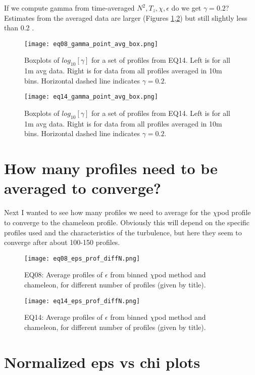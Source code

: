 \documentclass[11pt]{article}
\begin{document}
If we compute gamma from time-averaged $N^2,T_z,\chi,\epsilon$ do we get $\gamma=0.2$? Estimates from the averaged data are larger (Figures \ref{gambox_eq08},\ref{gambox_eq14}) but still slightly less than 0.2 .

\begin{figure}[htbp]
\texttt{[image: eq08\_gamma\_point\_avg\_box.png]}
\caption{Boxplots of $log_{10}[\gamma]$ for a set of profiles from EQ14. Left is for all 1m avg data. Right is for data from all profiles averaged in 10m bins. Horizontal dashed line indicates $\gamma=0.2$.}
\label{gambox_eq08}
\end{figure}

\begin{figure}[htbp]
\texttt{[image: eq14\_gamma\_point\_avg\_box.png]}
\caption{Boxplots of $log_{10}[\gamma]$ for a set of profiles from EQ14. Left is for all 1m avg data. Right is for data from all profiles averaged in 10m bins. Horizontal dashed line indicates $\gamma=0.2$.}
\label{gambox_eq14}
\end{figure}


\clearpage
\section{How many profiles need to be averaged to converge?}

Next I wanted to see how many profiles we need to average for the $\chi$pod profile to converge to the chameleon profile. Obviously this will depend on the specific profiles used and the characteristics of the turbulence, but here they seem to converge after about 100-150 profiles. 

\begin{figure}[htbp]
\texttt{[image: eq08\_eps\_prof\_diffN.png]}
\caption{EQ08: Average profiles of $\epsilon$ from binned $\chi$pod method and chameleon, for different number of profiles (given by title).}
\label{}
\end{figure}

\begin{figure}[htbp]
\texttt{[image: eq14\_eps\_prof\_diffN.png]}
\caption{EQ14: Average profiles of $\epsilon$ from binned $\chi$pod method and chameleon, for different number of profiles (given by title).}
\label{}
\end{figure}





\clearpage
\section{Normalized eps vs chi plots}
\end{document}
